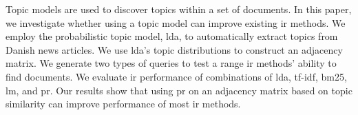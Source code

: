 Topic models are used to discover topics within a set of documents.
In this paper, we investigate whether using a topic model can improve existing \acrlong{ir} methods.
We employ the probabilistic topic model, \acrlong{lda}, to automatically extract topics from Danish news articles.
We use \acrlong{lda}'s topic distributions to construct an adjacency matrix.
We generate two types of queries to test a range \acrlong{ir} methods' ability to find documents.
We evaluate \acrlong{ir} performance of combinations of \acrlong{lda}, \acrlong{tf-idf}, \acrlong{bm25}, \acrlong{lm}, and \acrlong{pr}.
Our results show that using \acrlong{pr} on an adjacency matrix based on topic similarity can improve performance of most \acrlong{ir} methods.

